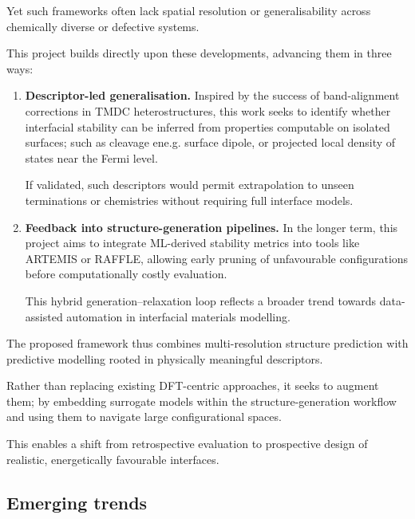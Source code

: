 Yet such frameworks often lack spatial resolution or generalisability across chemically diverse or defective systems.


This project builds directly upon these developments, advancing them in three ways:


\begin{enumerate}

   \item \textbf{Descriptor-led generalisation.} Inspired by the success of band-alignment corrections in TMDC
   heterostructures, this work seeks to identify whether interfacial stability can be inferred from properties
   computable on isolated surfaces; such as cleavage ene.g. surface dipole, or projected local density of states near
   the Fermi level.

   If validated, such descriptors would permit extrapolation to unseen terminations or chemistries without requiring
   full interface models.

   \item \textbf{Feedback into structure-generation pipelines.} In the longer term, this project aims to integrate
   ML-derived stability metrics into tools like \textsc{ARTEMIS} or \textsc{RAFFLE}, allowing early pruning of
   unfavourable configurations before computationally costly evaluation.

   This hybrid generation--relaxation loop reflects a broader trend towards data-assisted automation in interfacial
   materials modelling.

\end{enumerate}


The proposed framework thus combines multi-resolution structure prediction with predictive modelling rooted in
physically meaningful descriptors.

Rather than replacing existing DFT-centric approaches, it seeks to augment them; by embedding surrogate models within
the structure-generation workflow and using them to navigate large configurational spaces.

This enables a shift from retrospective evaluation to prospective design of realistic, energetically favourable
interfaces.


\subsection{Emerging trends}

